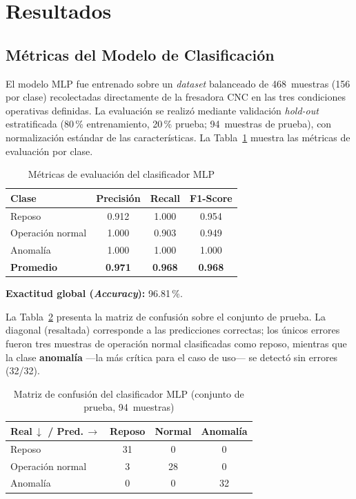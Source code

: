 \documentclass[journal,transmag]{IEEEtran}
\begin{document}

\section{Resultados}

\subsection{M\'etricas del Modelo de Clasificaci\'on}

El modelo MLP fue entrenado sobre un \textit{dataset} balanceado de 468~muestras
(156 por clase) recolectadas directamente de la fresadora CNC en las tres
condiciones operativas definidas. La evaluaci\'on se realiz\'o mediante
validaci\'on \textit{hold-out} estratificada (80\,\% entrenamiento, 20\,\%
prueba; 94~muestras de prueba), con normalizaci\'on estándar de las
caracter\'isticas. La Tabla~\ref{tab:metricas} muestra las m\'etricas de
evaluaci\'on por clase.

\begin{table}[!t]
\caption{M\'etricas de evaluaci\'on del clasificador MLP}
\label{tab:metricas}
\centering
\renewcommand{\arraystretch}{1.2}
\begin{tabular}{lccc}
\toprule
\textbf{Clase} & \textbf{Precisi\'on} & \textbf{Recall} & \textbf{F1-Score} \\
\midrule
Reposo           & 0.912 & 1.000 & 0.954 \\
Operaci\'on normal & 1.000 & 0.903 & 0.949 \\
Anomal\'ia        & 1.000 & 1.000 & 1.000 \\
\midrule
\textbf{Promedio} & \textbf{0.971} & \textbf{0.968} & \textbf{0.968} \\
\bottomrule
\end{tabular}
\end{table}

\textbf{Exactitud global (\textit{Accuracy}):} 96.81\,\%.

La Tabla~\ref{tab:confusion} presenta la matriz de confusi\'on sobre el
conjunto de prueba. La diagonal (resaltada) corresponde a las predicciones
correctas; los \'unicos errores fueron tres muestras de operaci\'on normal
clasificadas como reposo, mientras que la clase \textbf{anomal\'ia} ---la m\'as
cr\'itica para el caso de uso--- se detect\'o sin errores (32/32).

\begin{table}[!t]
\caption{Matriz de confusi\'on del clasificador MLP (conjunto de prueba, 94~muestras)}
\label{tab:confusion}
\centering
\renewcommand{\arraystretch}{1.3}
\setlength{\tabcolsep}{5pt}
\begin{tabular}{l|ccc}
\toprule
\textbf{Real\,$\downarrow$ / Pred.\,$\rightarrow$} & \textbf{Reposo} & \textbf{Normal} & \textbf{Anomal\'ia} \\
\midrule
Reposo            & \cellcolor{green!25}31 & 0  & 0 \\
Operaci\'on normal & 3  & \cellcolor{green!25}28 & 0 \\
Anomal\'ia        & 0  & 0  & \cellcolor{green!25}32 \\
\bottomrule
\end{tabular}
\end{table}
\end{document}
